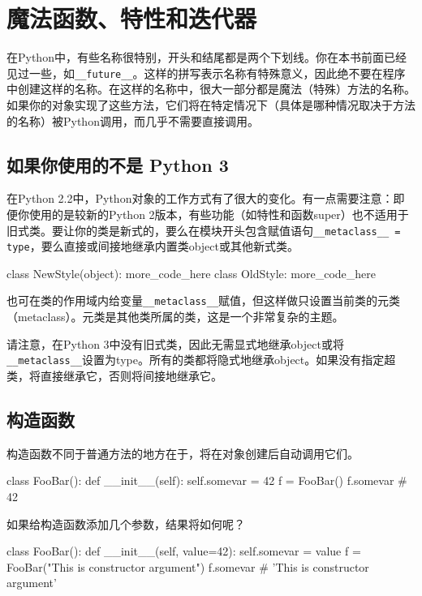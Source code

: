 \chapter{魔法函数、特性和迭代器\label{chapter09}}
在Python中，有些名称很特别，开头和结尾都是两个下划线。你在本书前面已经见过一些，如\verb|__future__|。这样的拼写表示名称有特殊意义，因此绝不要在程序中创建这样的名称。在这样的名称中，很大一部分都是魔法（特殊）方法的名称。如果你的对象实现了这些方法，它们将在特定情况下（具体是哪种情况取决于方法的名称）被Python调用，而几乎不需要直接调用。

\section{如果你使用的不是 Python 3}
在Python 2.2中，Python对象的工作方式有了很大的变化。有一点需要注意：即便你使用的是较新的Python 2版本，有些功能（如特性和函数super）也不适用于旧式类。要让你的类是新式的，要么在模块开头包含赋值语句\verb|__metaclass__ = type|，要么直接或间接地继承内置类object或其他新式类。

\begin{pyc}
class NewStyle(object):
    more_code_here
class OldStyle:
    more_code_here
\end{pyc}

\begin{tcolorbox}
也可在类的作用域内给变量\verb|__metaclass__|赋值，但这样做只设置当前类的元类（metaclass）。元类是其他类所属的类，这是一个非常复杂的主题。
\end{tcolorbox}

请注意，在Python 3中没有旧式类，因此无需显式地继承object或将\verb|__metaclass__|设置为type。所有的类都将隐式地继承object。如果没有指定超类，将直接继承它，否则将间接地继承它。

\section{构造函数}
构造函数不同于普通方法的地方在于，将在对象创建后自动调用它们。
\begin{pyc}
class FooBar():
    def __init__(self):
        self.somevar = 42
f = FooBar()
f.somevar  # 42
\end{pyc}
如果给构造函数添加几个参数，结果将如何呢？
\begin{pyc}
class FooBar():
    def __init__(self, value=42):
        self.somevar = value
f = FooBar("This is constructor argument")
f.somevar  # 'This is constructor argument'
\end{pyc}

